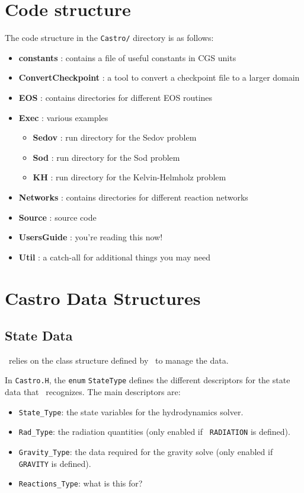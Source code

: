 \section{Code structure}

The code structure in the {\tt Castro/} directory is as follows:

\begin{itemize}
    \item {\bf constants}      : contains a file of useful constants in CGS units
    \item {\bf ConvertCheckpoint} : a tool to convert a checkpoint file to a larger domain
    \item {\bf EOS}            : contains directories for different EOS routines
    \item {\bf Exec}       : various examples
    \begin{itemize}
      \item {\bf Sedov}        : run directory for the Sedov problem
      \item {\bf Sod}          : run directory for the Sod problem
      \item {\bf KH}           : run directory for the Kelvin-Helmholz problem
    \end{itemize}
    \item {\bf Networks}       : contains directories for different reaction networks
    \item {\bf Source}     : source code
    \item {\bf UsersGuide} : you're reading this now!
    \item {\bf Util}       : a catch-all for additional things you may need 
\end{itemize}

\section{Castro Data Structures}

\subsection{State Data}

\castro\ relies on the class structure defined by \boxlib\ to manage the
data.

In {\tt Castro.H}, the {\tt enum} {\tt StateType} defines the
different descriptors for the state data that \castro\ recognizes.  The
main descriptors are:
\begin{itemize}
\item {\tt State\_Type}: the state variables for the hydrodynamics solver.

\item {\tt Rad\_Type}: the radiation quantities (only enabled if {\tt
  RADIATION} is defined).

\item {\tt Gravity\_Type}: the data required for the gravity solve (only
  enabled if {\tt GRAVITY} is defined).

\item {\tt Reactions\_Type}: {\color{red} what is this for?}
\end{itemize}

